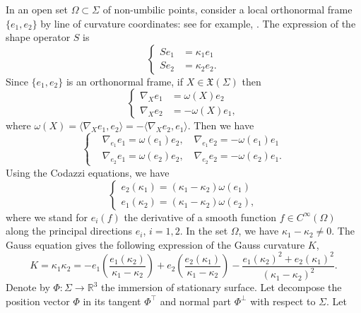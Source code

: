 \documentclass[a4paper,12pt]{amsart}
\theoremstyle{definition}
\def\r{\mathbb R}
\begin{document}
In an open set $\Omega\subset\Sigma$ of non-umbilic points, consider a local
orthonormal frame $\{e_1,e_2\}$ by line of curvature coordinates: see for example,  \cite[Ch. 3]{pt}. The expression of the shape operator $S$ is 
\begin{equation}\label{b0}
\left\{
\begin{split}
Se_1&=\kappa_1 e_1\\
Se_2&=\kappa_2 e_2.
\end{split}
\right.
    \end{equation}
Since $\{e_1,e_2\}$ is an orthonormal frame, if $X\in\mathfrak{X}(\Sigma)$ then
\begin{equation*}
\left\{
\begin{split}
\nabla_X e_1&=\omega(X)e_2\\
 \nabla_X e_2&=-\omega(X)e_1,
\end{split}
\right.
\end{equation*}
where $\omega(X)=\langle\nabla_X e_1,e_2\rangle=-\langle\nabla_X e_2,e_1\rangle$. Then we have 
\begin{equation}\label{eiej}
\left\{
\begin{split}
&\nabla_{e_1}e_1=\omega(e_1)e_2,\quad \nabla_{e_1}e_2=-\omega(e_1)e_1\\
&\nabla_{e_2}e_1=\omega(e_2)e_2,\quad \nabla_{e_2}e_2=-\omega(e_2)e_1.
\end{split}\right.
\end{equation}
Using the Codazzi equations, we have  
\begin{equation}\label{b1}
    \left\{
    \begin{array}{ll}
        e_{2}(\kappa_1)=(\kappa_1-\kappa_2)\omega(e_1)\\
        e_{1}(\kappa_2)=(\kappa_1-\kappa_2)\omega(e_2),
    \end{array}
    \right.
\end{equation}
where we stand for $e_i(f)$ the derivative of a smooth function $f\in C^\infty(\Omega)$ along the principal directions $e_i$, $i=1,2$.  In the set $\Omega$, we have $\kappa_1-\kappa_2\not=0$. The  Gauss equation  gives the following expression of the Gauss curvature  $K$,  
\begin{equation}\label{bb}
   K=\kappa_1\kappa_2=-e_1\left(\frac{e_1( \kappa_2 )}{\kappa_1-\kappa_2} \right)+e_2\left(\frac{e_2( \kappa_1 )}{\kappa_1 -\kappa_2}\right)
   -\frac{e_1( \kappa_2)^2+ e_2( \kappa_1 )^2}{(\kappa_1 -\kappa_2)^2}.
\end{equation}
 Denote by $\Phi\colon\Sigma\to\r^3$ the immersion of stationary surface. Let  decompose the position vector $\Phi$ in its tangent  $\Phi^\top$ and normal part $\Phi^\perp$ with respect to $\Sigma$. Let 
\end{document}
